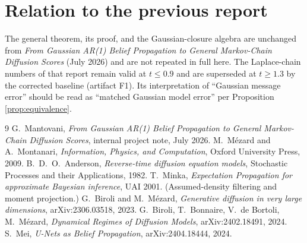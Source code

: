 \documentclass[11pt]{article}
\begin{document}
\section{Relation to the previous report}
The general theorem, its proof, and the Gaussian-closure algebra are unchanged from
\emph{From Gaussian AR(1) Belief Propagation to General Markov-Chain Diffusion Scores}
(July 2026) and are not repeated in full here. The Laplace-chain numbers of that
report remain valid at $t\le0.9$ and are superseded at $t\ge1.3$ by the corrected
baseline (artifact F1). Its interpretation of ``Gaussian message error'' should be
read as ``matched Gaussian model error'' per Proposition \ref{prop:equivalence}.

\begin{thebibliography}{9}
 G.\ Mantovani, \emph{From Gaussian AR(1) Belief Propagation to
General Markov-Chain Diffusion Scores}, internal project note, July 2026.
 M.\ M\'ezard and A.\ Montanari, \emph{Information, Physics,
and Computation}, Oxford University Press, 2009.
 B.\ D.\ O.\ Anderson, \emph{Reverse-time diffusion equation
models}, Stochastic Processes and their Applications, 1982.
 T.\ Minka, \emph{Expectation Propagation for approximate Bayesian
inference}, UAI 2001. (Assumed-density filtering and moment projection.)
 G.\ Biroli and M.\ M\'ezard, \emph{Generative diffusion in very
large dimensions}, arXiv:2306.03518, 2023.
 G.\ Biroli, T.\ Bonnaire, V.\ de Bortoli, M.\ M\'ezard,
\emph{Dynamical Regimes of Diffusion Models}, arXiv:2402.18491, 2024.
 S.\ Mei, \emph{U-Nets as Belief Propagation}, arXiv:2404.18444, 2024.
\end{thebibliography}
\end{document}
